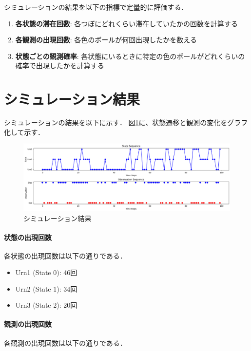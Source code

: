 \documentclass[dvipdfmx,titlepage,a4j]{jsarticle}
\begin{document}
シミュレーションの結果を以下の指標で定量的に評価する．

\begin{enumerate}
    \item \textbf{各状態の滞在回数}: 各つぼにどれくらい滞在していたかの回数を計算する
    \item \textbf{各観測の出現回数}: 各色のボールが何回出現したかを数える
    \item \textbf{状態ごとの観測確率}: 各状態にいるときに特定の色のボールがどれくらいの確率で出現したかを計算する
\end{enumerate}

\section{シミュレーション結果}

シミュレーションの結果を以下に示す．
図\ref{fig:sim}に、状態遷移と観測の変化をグラフ化して示す．

\begin{figure}[H]
    \centering
    \includegraphics[width=1.0\textwidth]{picture/sim.png}
    \caption{シミュレーション結果}
    \label{fig:sim}
\end{figure}

\paragraph{状態の出現回数}
各状態の出現回数は以下の通りである．

\begin{itemize}
    \item Urn1 (State 0): 46回
    \item Urn2 (State 1): 34回
    \item Urn3 (State 2): 20回
\end{itemize}

\paragraph{観測の出現回数}
各観測の出現回数は以下の通りである．
\end{document}
